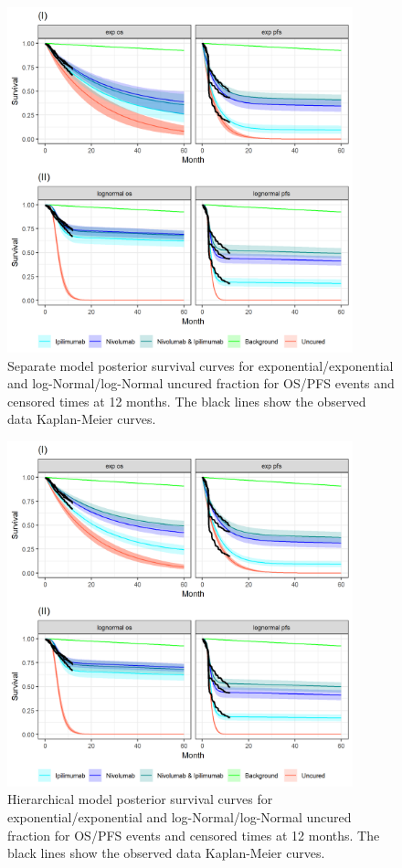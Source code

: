 \documentclass[AMA,STIX1COL]{WileyNJD-v2}
\begin{document}
\begin{figure}[!H]
\centering
\includegraphics[height=10cm, width=0.6\linewidth]{plot_S_grid_cf_sep_cpt_12m.png}
\caption{\label{fig:S_cutpoint_12mo_sep} Separate model posterior survival curves for exponential/exponential and log-Normal/log-Normal uncured fraction for OS/PFS events and censored times at 12 months. The black lines show the observed data Kaplan-Meier curves.}
\end{figure}

\begin{figure}[!H]
\centering
\includegraphics[height=10cm, width=0.6\linewidth]{plot_S_grid_cf_hier_cpt_12m.png}
\caption{\label{fig:S_cutpoint_12mo_hier} Hierarchical model posterior survival curves for exponential/exponential and log-Normal/log-Normal uncured fraction for OS/PFS events and censored times at 12 months. The black lines show the observed data Kaplan-Meier curves.}
\end{figure}
\end{document}
